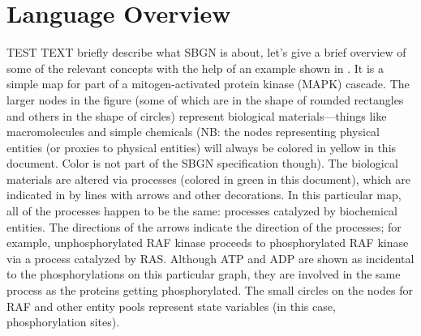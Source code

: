 \chapter{Language Overview}
\label{chp:concepts}

\label{sec:PD-overview}

 TEST TEXT briefly describe what SBGN \PDl is about, let's give a brief overview of some of the relevant concepts with the help of an example shown in . It is a simple map for part of a mitogen-activated protein kinase (MAPK) cascade.  The larger nodes in the figure (some of which are in the shape of rounded rectangles and others in the shape of circles) represent biological materials---things like macromolecules and simple chemicals (NB: the nodes representing physical entities (or proxies to physical entities) will always be colored in yellow in this document. Color is not part of the SBGN specification though).
 The biological materials are altered via processes (colored in green in this document), which are indicated in \PDl by lines with arrows and other decorations.  In this particular map, all of the processes happen to be the same: processes catalyzed by biochemical entities.
 The directions of the arrows indicate the direction of the processes; for example, unphosphorylated RAF kinase proceeds to phosphorylated RAF kinase via a process catalyzed by RAS. Although ATP and ADP are shown as incidental to the phosphorylations on this particular graph, they are involved in the same process as the proteins getting
 phosphorylated. The small circles on the nodes for RAF and other entity pools represent state variables (in this case, phosphorylation sites).

